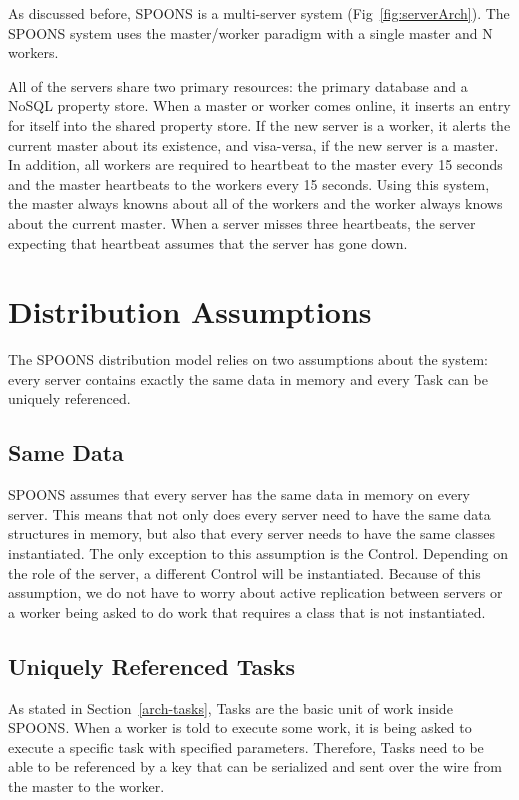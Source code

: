 \documentclass[12pt]{ucthesis}
\begin{document}
As discussed before, SPOONS is a multi-server system (Fig~\ref{fig:serverArch}).
The SPOONS system uses the master/worker paradigm with a single master and N workers.

All of the servers share two primary resources: the primary database and a NoSQL property store.
When a master or worker comes online, it inserts an entry for itself into the shared property store.
If the new server is a worker, it alerts the current master about its existence, and visa-versa,
if the new server is a master. In addition, all workers are required to heartbeat to the master every
15 seconds and the master heartbeats to the workers every 15 seconds. Using this system, the master
always knowns about all of the workers and the worker always knows about the current master.
When a server misses three heartbeats, the server expecting that heartbeat assumes that the server has
gone down.

\section{Distribution Assumptions}
\label{arch-dist-assumptions}

The SPOONS distribution model relies on two assumptions about the system: every server contains
exactly the same data in memory and every Task can be uniquely referenced.

\subsection{Same Data}
SPOONS assumes that every server has the same data in memory on every server.
This means that not only does every server need to have the same data structures in memory,
but also that every server needs to have the same classes instantiated. The only exception to this
assumption is the Control. Depending on the role of the server, a different Control will be
instantiated. Because of this assumption, we do not have to worry about active replication
between servers or a worker being asked to do work that requires a class that is not instantiated.

\subsection{Uniquely Referenced Tasks}
As stated in Section~\ref{arch-tasks}, Tasks are the basic unit of work inside SPOONS.
When a worker is told to execute some work, it is being asked to execute a specific task with specified
parameters. Therefore, Tasks need to be able to be referenced by a key that can be serialized and
sent over the wire from the master to the worker.
\end{document}
